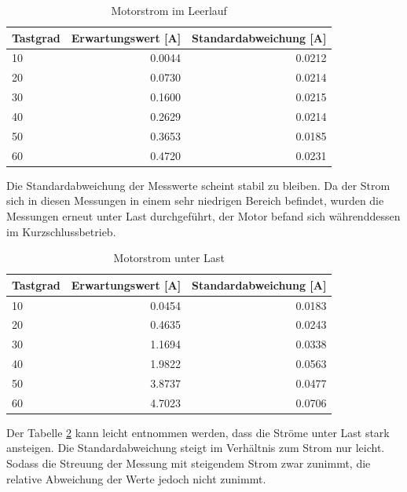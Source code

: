 \begin{table}[H]
  \centering
  \begin{tabularx}{\textwidth}{|X|r|r|}
    \hline
    Tastgrad & Erwartungswert [\si{\A}] & Standardabweichung [\si{\A}]  \\ \hline \hline
    10 & \num{0,0044} & \num{0,0212}\\ \hline
    20 & \num{0,0730} & \num{0,0214}\\ \hline
    30 & \num{0,1600} & \num{0,0215}\\ \hline
    40 & \num{0,2629} & \num{0,0214}\\ \hline
    50 & \num{0,3653} & \num{0,0185}\\ \hline
    60 & \num{0,4720} & \num{0,0231}\\ \hline

  \end{tabularx}
  \caption{Motorstrom im Leerlauf}%
  \label{tab:current_noload}
\end{table}

Die Standardabweichung der Messwerte scheint stabil zu bleiben. Da der Strom sich in diesen Messungen in einem sehr niedrigen Bereich befindet, wurden
die Messungen erneut unter Last durchgeführt, der Motor befand sich währenddessen im Kurzschlussbetrieb.

\begin{table}[H]
  \centering
  \begin{tabularx}{\textwidth}{|X|r|r|}
    \hline
    Tastgrad & Erwartungswert [\si{\A}] & Standardabweichung [\si{\A}]  \\ \hline \hline
    10 & \num{0,0454} & \num{0,0183}\\ \hline
    20 & \num{0,4635} & \num{0,0243}\\ \hline
    30 & \num{1,1694} & \num{0,0338}\\ \hline
    40 & \num{1,9822} & \num{0,0563}\\ \hline
    50 & \num{3,8737} & \num{0,0477}\\ \hline
    60 & \num{4,7023} & \num{0,0706}\\ \hline
  \end{tabularx}
  \caption{Motorstrom unter Last}%
  \label{tab:current_load}
\end{table}

Der Tabelle \ref{tab:current_load} kann leicht entnommen werden, dass die Ströme unter Last stark ansteigen. Die Standardabweichung steigt im Verhältnis zum Strom nur leicht.
Sodass die Streuung der Messung mit steigendem Strom zwar zunimmt, die relative Abweichung der Werte jedoch nicht zunimmt.


